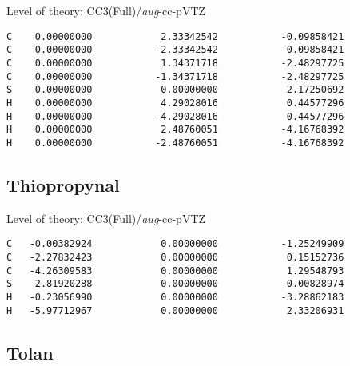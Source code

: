 \documentclass[journal=jctcce,manuscript=article,layout=traditional]{achemso}
\newcommand{\AVTZ}{\emph{aug}-cc-pVTZ}
\begin{document}
\begin{singlespace}
Level of theory: CC3(Full)/{\AVTZ}
\begin{verbatim}
C    0.00000000            2.33342542           -0.09858421
C    0.00000000           -2.33342542           -0.09858421
C    0.00000000            1.34371718           -2.48297725
C    0.00000000           -1.34371718           -2.48297725
S    0.00000000            0.00000000            2.17250692
H    0.00000000            4.29028016            0.44577296
H    0.00000000           -4.29028016            0.44577296
H    0.00000000            2.48760051           -4.16768392
H    0.00000000           -2.48760051           -4.16768392
\end{verbatim}
\end{singlespace}

\subsection*{Thiopropynal}

\begin{singlespace}
Level of theory: CC3(Full)/{\AVTZ}
\begin{verbatim}
C   -0.00382924            0.00000000           -1.25249909
C   -2.27832423            0.00000000            0.15152736
C   -4.26309583            0.00000000            1.29548793
S    2.81920288            0.00000000           -0.00828974
H   -0.23056990            0.00000000           -3.28862183
H   -5.97712967            0.00000000            2.33206931
\end{verbatim}
\end{singlespace}

\subsection*{Tolan}
\end{document}
